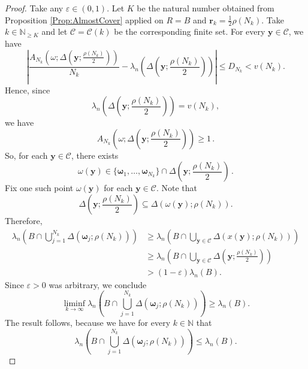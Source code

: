 \documentclass[10pt,a4paper]{amsart}
\newcommand{\N}{\mathbb N}%
\begin{document}
\begin{proof}
Take any $\varepsilon\in (0,1)$. Let $K$ be the natural number obtained from Proposition \ref{Prop:AlmostCover} applied on $R=B$ and $\mathbf{r}_k =\frac{1}{2} \rho(N_k)$. Take $k\in\N_{\geq K}$ and let $\mathcal{C}=\mathcal{C}(k)$ be the corresponding finite set. For every $\mathbf{y}\in \mathcal{C}$, we have 
\[
\left| 
\frac{A_{N_k}\left(\omega;\Delta\left(\mathbf{y}; \frac{\rho(N_k)}{2}\right) \right)}{N_k} -
 \lambda_n\left(\Delta\left(\mathbf{y}; \frac{\rho(N_k)}{2} \right)\right)
\right|
\leq 
D_{N_k} < v(N_k).
\]
Hence, since
\[
 \lambda_n\left(\Delta\left(\mathbf{y}; \frac{\rho(N_k)}{2} \right)\right) = v(N_k),
\]
we have
\[
A_{N_k}\left(\omega;\Delta\left(\mathbf{y}; \frac{\rho(N_k)}{2}\right) \right)\geq 1\, .
\]
So, for each $\mathbf{y}\in \mathcal{C}$, there exists 
\[
\omega(\mathbf{y})
\in 
\{\boldsymbol{\omega}_1,\ldots, \boldsymbol{\omega}_{N_k}\}\cap \Delta\left(\mathbf{y}; \frac{\rho(N_k)}{2} \right)\, .
\]
Fix one such point $\omega(\mathbf{y})$ for each $\mathbf{y}\in\mathcal{C}$. Note that 
\[
\Delta\left(\mathbf{y}; \frac{\rho(N_k)}{2} \right)
\subseteq
\Delta\left(\omega(\mathbf{y}); \rho(N_k) \right).
\]
Therefore, 
\begin{align*}
\lambda_n\left( B\cap\bigcup_{j=1}^{N_k} \Delta(\boldsymbol{\omega}_j;\rho(N_k))\right)
&\geq
\lambda_n\left( B\cap\bigcup_{\mathbf{y}\in \mathcal{C}} \Delta(x(\mathbf{y}) ;\rho(N_k))\right) \\
&\geq
\lambda_n\left( B\cap\bigcup_{\mathbf{y}\in \mathcal{C}} \Delta\left(\mathbf{y} ;\frac{\rho(N_k)}{2} \right)\right) \\
&>
(1-\varepsilon) \lambda_n(B).
\end{align*}
Since $\varepsilon>0$ was arbitrary, we conclude
\[
\liminf_{k\to\infty} \lambda_n\left( B\cap\bigcup_{j=1}^{N_k} \Delta(\boldsymbol{\omega}_j;\rho(N_k))\right)
\geq 
\lambda_n(B).
\]
The result follows, because we have for every $k\in\mathbb{N}$ that
\[
\lambda_n\left( B\cap\bigcup_{j=1}^{N_k} \Delta(\boldsymbol{\omega}_j;\rho(N_k))\right)
\leq 
\lambda_n(B).
\]
\end{proof}
\end{document}
